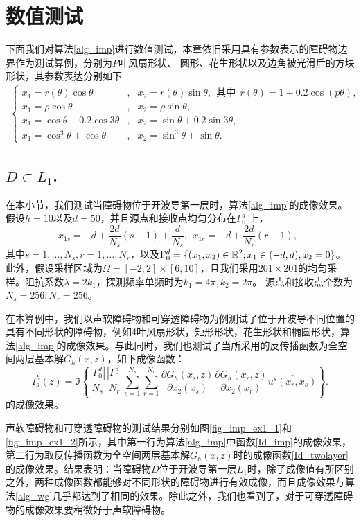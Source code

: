 \section{数值测试}
下面我们对算法\ref{alg_imp}进行数值测试，本章依旧采用具有参数表示的障碍物边界作为测试算例，分别为$P$叶风扇形状、 圆形、花生形状以及边角被光滑后的方块形状，其参数表达分别如下
\begin{eqnarray}\label{obstacle_example2}
\left\{
\begin{array}{lll}
x_1=r(\theta)\cos\theta&,& x_2=r(\theta)\sin\theta,\ \ \mbox{其中}\ \ r(\theta)=1+0.2\cos(p\theta),\\
x_1=\rho\cos{\theta}&,& x_2=\rho\sin{\theta},\\
x_1=\cos{\theta}+0.2\cos{3\theta}&,& x_2=\sin{\theta}+0.2\sin{3\theta},\\
x_1=\cos^3\theta+\cos{\theta}&,& x_2=\sin^3\theta+\sin{\theta}.
\end{array}
\right.
\end{eqnarray}
\subsection{$D\subset L_1$.}

在本小节，我们测试当障碍物位于开波导第一层时，算法\ref{alg_imp}的成像效果。假设$h=10$以及$d=50$，并且源点和接收点均匀分布在$\Gamma_0^d$ 上，
$$
 x_{1s}=-d+\frac{2d}{N_s}(s-1)+\frac{d}{N_s},\  \ x_{1r}=-d+\frac{2d}{N_r}(r-1),\ \
$$
其中$s=1,\ldots,N_s, r=1,\ldots,N_r$，以及$\Gamma_0^d=\{(x_1,x_2)\in\mathbb{R}^2;x_1\in(-d,d),x_2=0\}$。此外，假设采样区域为$\Omega=[-2,2]\times[6,10]$，且我们采用$201\times201$的均匀采样。阻抗系数$\lambda=2 k_1$，探测频率单频时为$k_1=4\pi,k_2=2\pi$。 源点和接收点个数为$N_s=256,N_r=256$。

\begin{example}[不同形状]\label{imp_ex1}
在本算例中，我们以声软障碍物和可穿透障碍物为例测试了位于开波导不同位置的具有不同形状的障碍物，例如4叶风扇形状，矩形形状，花生形状和椭圆形状，算法\ref{alg_imp}的成像效果。与此同时，我们也测试了当所采用的反传播函数为全空间两层基本解$G_h(x,z)$，如下成像函数：
\begin{equation}\label{Id_twolayer}
   I_d^h(z)=\Im\left\{\frac{|\Gamma_0^d|}{N_s}\frac{|\Gamma_0^d|}{N_r}\sum\limits_{s=1}^{N_s}\sum\limits_{r=1}^{N_r}\frac{\partial G_h(x_s,z)}{\partial x_2(x_s)}\frac{\partial G_h(x_r,z)}{\partial x_2(x_r)}\overline{u^s(x_r,x_s)}
  \right\}.
\end{equation}
的成像效果。

声软障碍物和可穿透障碍物的测试结果分别如图\ref{fig_imp_ex1_1}和\ref{fig_imp_ex1_2}所示，其中第一行为算法\ref{alg_imp}中函数\ref{Id_imp}的成像效果，第二行为取反传播函数为全空间两层基本解$G_h(x,z)$时的成像函数\ref{Id_twolayer}的成像效果。结果表明：当障碍物$D$位于开波导第一层$L_1$时，除了成像值有所区别之外，两种成像函数都能够对不同形状的障碍物进行有效成像，而且成像效果与算法\ref{alg_wg}几乎都达到了相同的效果。除此之外，我们也看到了，对于可穿透障碍物的成像效果要稍微好于声软障碍物。
\end{example}

